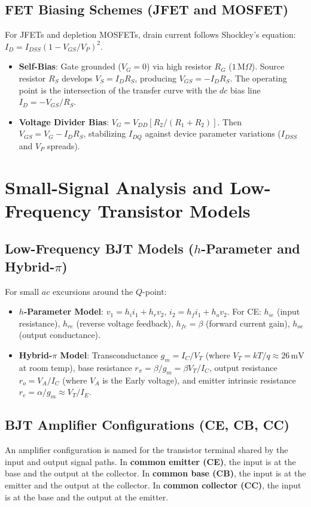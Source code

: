 \documentclass[12pt,a4paper]{article}
\begin{document}
\subsection{FET Biasing Schemes (JFET and MOSFET)}
For JFETs and depletion MOSFETs, drain current follows Shockley's equation: $I_D = I_{DSS}(1 - V_{GS}/V_P)^2$.
\begin{itemize}[leftmargin=1.5em, itemsep=2pt]
  \item \textbf{Self-Bias}: Gate grounded ($V_G = 0$) via high resistor $R_G$ ($1\,\mathrm{M}\Omega$). Source resistor $R_S$ develops $V_S = I_D R_S$, producing $V_{GS} = -I_D R_S$. The operating point is the intersection of the transfer curve with the $dc$ bias line $I_D = -V_{GS}/R_S$.
  \item \textbf{Voltage Divider Bias}: $V_G = V_{DD}[R_2/(R_1+R_2)]$. Then $V_{GS} = V_G - I_D R_S$, stabilizing $I_{DQ}$ against device parameter variations ($I_{DSS}$ and $V_P$ spreads).
\end{itemize}

\section{Small-Signal Analysis and Low-Frequency Transistor Models}

\subsection{Low-Frequency BJT Models \texorpdfstring{($h$-Parameter and Hybrid-$\pi$)}{(h-Parameter and Hybrid-pi)}}
For small $ac$ excursions around the $Q$-point:
\begin{itemize}[leftmargin=1.5em, itemsep=2pt]
  \item \textbf{$h$-Parameter Model}: $v_1 = h_i i_1 + h_r v_2$, $i_2 = h_f i_1 + h_o v_2$. For CE: $h_{ie}$ (input resistance), $h_{re}$ (reverse voltage feedback), $h_{fe} = \beta$ (forward current gain), $h_{oe}$ (output conductance).
  \item \textbf{Hybrid-$\pi$ Model}: Transconductance $g_m = I_C/V_T$ (where $V_T = k T/q \approx 26\,\mathrm{mV}$ at room temp), base resistance $r_\pi = \beta/g_m = \beta V_T/I_C$, output resistance $r_o = V_A/I_C$ (where $V_A$ is the Early voltage), and emitter intrinsic resistance $r_e = \alpha/g_m \approx V_T/I_E$.
\end{itemize}

\subsection{BJT Amplifier Configurations (CE, CB, CC)}
\begin{tcolorbox}[defbox, title={Common-Terminal BJT Configurations}]
An amplifier configuration is named for the transistor terminal shared by the input and output signal paths. In \textbf{common emitter (CE)}, the input is at the base and the output at the collector. In \textbf{common base (CB)}, the input is at the emitter and the output at the collector. In \textbf{common collector (CC)}, the input is at the base and the output at the emitter.
\end{tcolorbox}
\end{document}
